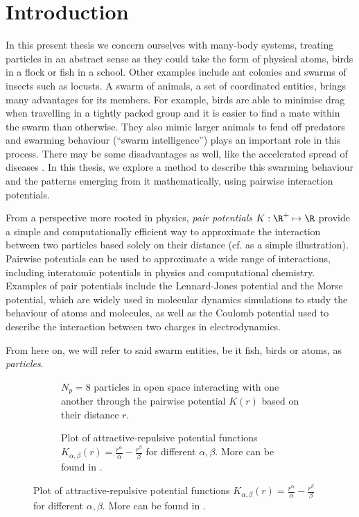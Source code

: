 \chapter{Introduction}
\label{chap:introduction}

In this present thesis we concern ourselves with many-body systems, treating particles in an abstract sense as they could take the form of physical atoms, birds in a flock or fish in a school.
Other examples include ant colonies and swarms of insects such as locusts.
A swarm of animals, a set of coordinated entities, brings many advantages for its members.
For example, birds are able to minimise drag when travelling in a tightly packed group and it is easier to find a mate within the swarm than otherwise.
They also mimic larger animals to fend off predators and swarming behaviour (``swarm intelligence'') plays an important role in this process.
There may be some disadvantages as well, like the accelerated spread of diseases \parencite{2017-maria-orsogna-swarm-video}.
In this thesis, we explore a method to describe this swarming behaviour and the patterns emerging from it mathematically, using pairwise interaction potentials.

From a perspective more rooted in physics, \textit{pair potentials} $K: \R^+ \mapsto \R$ provide a simple and computationally efficient way to approximate the interaction between two particles based solely on their distance (cf.  as a simple illustration).
Pairwise potentials can be used to approximate a wide range of interactions, including interatomic potentials in physics and computational chemistry.
Examples of pair potentials include the Lennard-Jones potential and the Morse potential, which are widely used in molecular dynamics simulations to study the behaviour of atoms and molecules, as well as the Coulomb potential used to describe the interaction between two charges in electrodynamics.

From here on, we will refer to said swarm entities, be it fish, birds or atoms, as \textit{particles}.

\begin{figure}[H]
  \centering
  \begin{subfigure}[t]{0.47\textwidth}
    \centering
    \caption[]{$N_p = 8$ particles in open space interacting with one another through the pairwise potential $K(r)$ based on their distance $r$.}
    \label{fig:problem-setting}
  \end{subfigure}
  \hfill
  \begin{subfigure}[t]{0.47\textwidth}
    \centering
    \caption[]{Plot of attractive-repulsive potential functions $K_{\alpha, \beta}(r) = \frac{r^\alpha}{\alpha} - \frac{r^\beta}{\beta}$ for different $\alpha, \beta$. More can be found in .}
    \label{fig:potential-function}
  \end{subfigure}
\end{figure}

